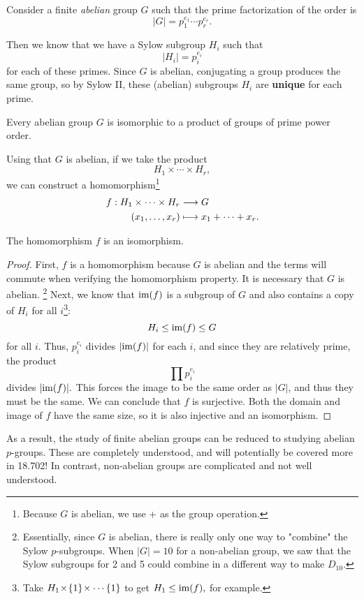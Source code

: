 Consider a finite \emph{abelian} group $G$ such that the prime factorization of the order is \[|G| = p_1^{e_1} \cdots p_r ^{e_r}.\]

Then we know that we have a Sylow subgroup $H_i$ such that \[|H_i| = p_i^{e_i}\] for each of these primes. Since $G$ is abelian, conjugating a group produces the same group, so by Sylow II, these (abelian) subgroups $H_i$ are \textbf{unique} for each prime.

\begin{theorem}
Every abelian group $G$ is isomorphic to a product of groups of prime power order.
\end{theorem}

Using that $G$ is abelian, if we take the product \[H_1 \times \cdots \times H_r,\] we can construct a homomorphism\footnote{Because $G$ is abelian, we use + as the group operation.}
\begin{align*}
    f: H_1 \times \cdots \times H_r &\longrightarrow G \\
    (x_1, \ldots, x_r) &\longmapsto x_1+ \cdots + x_r.
\end{align*}

\begin{lemma}
    The homomorphism $f$ is an isomorphism.
\end{lemma}


\begin{proof}
    First, $f$ is a homomorphism because $G$ is abelian and the terms will commute when verifying the homomorphism property. It is necessary that $G$ is abelian. \footnote{Essentially, since $G$ is abelian, there is really only one way to "combine" the Sylow $p$-subgroups. When $|G| = 10$ for a non-abelian group, we saw that the Sylow subgroups for 2 and 5 could combine in a different way to make $D_{10}.$} Next, we know that $\operatorname{im}(f)$ is a subgroup of $G$ and also contains a copy of $H_i$ for all $i$\footnote{Take $H_1 \hspace{0.05em}{\times}\hspace{0.05em} \{1\} \hspace{0.05em}{\times}\hspace{0.05em} \cdots \{1\}$ to get $H_1 \leq \operatorname{im}(f),$ for example.}: \[H_i \leq \operatorname{im}(f) \leq G\] for all $i.$
    Thus, $p_i^{e_i}$ divides $\lvert\operatorname{im}(f)\rvert$ for each $i$, and since they are relatively prime, the product 
    \[\prod p_i^{e_i}\] divides $\lvert\operatorname{im}(f)\rvert.$ This forces the image to be the same order as $|G|$, and thus they must be the same. We can conclude that $f$ is surjective. Both the domain and image of $f$ have the same size, so it is also injective and an isomorphism.
\end{proof}

As a result, the study of finite abelian groups can be reduced to studying abelian $p$-groups. These are completely understood, and will potentially be covered more in 18.702! In contrast, non-abelian groups are complicated and not well understood.

